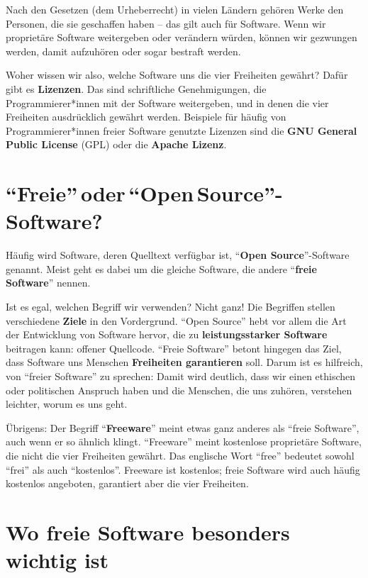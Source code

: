 \documentclass[a5paper,12pt]{scrartcl}
\begin{document}
Nach den Gesetzen (dem Urheberrecht) in vielen Ländern gehören Werke
den Personen, die sie geschaffen haben -- das gilt auch für
Software. Wenn wir proprietäre Software weitergeben oder verändern
würden, können wir gezwungen werden, damit aufzuhören oder sogar
bestraft werden.

Woher wissen wir also, welche Software uns die vier Freiheiten
gewährt? Dafür gibt es \textbf{Lizenzen}. Das sind schriftliche
Genehmigungen, die Programmierer*innen mit der Software weitergeben,
und in denen die vier Freiheiten ausdrücklich gewährt
werden. Beispiele für häufig von Programmierer*innen freier Software
genutzte Lizenzen sind die \textbf{GNU General Public License} (GPL)
oder die \textbf{Apache Lizenz}.


\section{"`Freie"'\,oder\,"`Open\,Source"'-Software?}

Häufig wird Software, deren Quelltext verfügbar ist, "`\textbf{Open
  Source}"'-Software genannt. Meist geht es dabei um die gleiche
Software, die andere "`\textbf{freie Software}"' nennen.

Ist es egal, welchen Begriff wir verwenden? Nicht ganz! Die Begriffen
stellen verschiedene \textbf{Ziele} in den Vordergrund. "`Open
Source"' hebt vor allem die Art der Entwicklung von Software hervor,
die zu \textbf{leistungsstarker Software} beitragen kann: offener
Quellcode. "`Freie Software"' betont hingegen das Ziel, dass Software
uns Menschen \textbf{Freiheiten garantieren} soll. Darum ist es
hilfreich, von "`freier Software"' zu sprechen: Damit wird deutlich,
dass wir einen ethischen oder politischen Anspruch haben und die
Menschen, die uns zuhören, verstehen leichter, worum es uns geht.

Übrigens: Der Begriff "`\textbf{Freeware}"' meint etwas ganz anderes
als "`freie Software"', auch wenn er so ähnlich klingt. "`Freeware"'
meint kostenlose proprietäre Software, die nicht die vier Freiheiten
gewährt. Das englische Wort "`free"' bedeutet sowohl "`frei"' als auch
"`kostenlos"'. Freeware ist kostenlos; freie Software wird auch häufig
kostenlos angeboten, garantiert aber die vier Freiheiten.


\section{Wo freie Software besonders wichtig ist}
\end{document}
